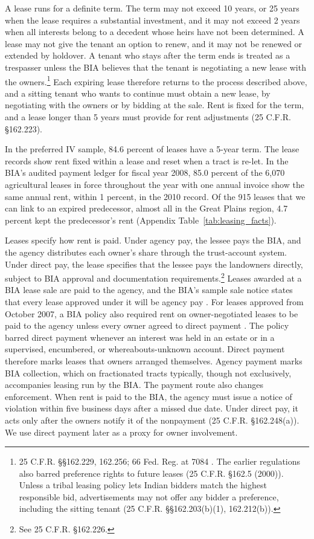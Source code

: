 \documentclass[12pt]{article}
\begin{document}
A lease runs for a definite term. The term may not exceed 10 years, or 25 years when the lease requires a substantial investment, and it may not exceed 2 years when all interests belong to a decedent whose heirs have not been determined. A lease may not give the tenant an option to renew, and it may not be renewed or extended by holdover. A tenant who stays after the term ends is treated as a trespasser unless the BIA believes that the tenant is negotiating a new lease with the owners.\footnote{25 C.F.R. \S\S 162.229, 162.256; 66 Fed. Reg. at 7084 \citep{DOI2001LeasingRule}. The earlier regulations also barred preference rights to future leases (25 C.F.R. \S 162.5 (2000)). Unless a tribal leasing policy lets Indian bidders match the highest responsible bid, advertisements may not offer any bidder a preference, including the sitting tenant (25 C.F.R. \S\S 162.203(b)(1), 162.212(b)).} Each expiring lease therefore returns to the process described above, and a sitting tenant who wants to continue must obtain a new lease, by negotiating with the owners or by bidding at the sale. Rent is fixed for the term, and a lease longer than 5 years must provide for rent adjustments (25 C.F.R. \S 162.223).

In the preferred IV sample, 84.6 percent of leases have a 5-year term. The lease records show rent fixed within a lease and reset when a tract is re-let. In the BIA's audited payment ledger for fiscal year 2008, 85.0 percent of the 6,070 agricultural leases in force throughout the year with one annual invoice show the same annual rent, within 1 percent, in the 2010 record. Of the 915 leases that we can link to an expired predecessor, almost all in the Great Plains region, 4.7 percent kept the predecessor's rent (Appendix Table~\ref{tab:leasing_facts}).

Leases specify how rent is paid. Under agency pay, the lessee pays the BIA, and the agency distributes each owner's share through the trust-account system. Under direct pay, the lease specifies that the lessee pays the landowners directly, subject to BIA approval and documentation requirements.\footnote{See 25 C.F.R. \S 162.226.} Leases awarded at a BIA lease sale are paid to the agency, and the BIA's sample sale notice states that every lease approved under it will be agency pay \citep[Attachment~14A]{BIA2006Ch2}. For leases approved from October 2007, a BIA policy also required rent on owner-negotiated leases to be paid to the agency unless every owner agreed to direct payment \citep{BIA2007NPM}. The policy barred direct payment whenever an interest was held in an estate or in a supervised, encumbered, or whereabouts-unknown account. Direct payment therefore marks leases that owners arranged themselves. Agency payment marks BIA collection, which on fractionated tracts typically, though not exclusively, accompanies leasing run by the BIA. The payment route also changes enforcement. When rent is paid to the BIA, the agency must issue a notice of violation within five business days after a missed due date. Under direct pay, it acts only after the owners notify it of the nonpayment (25 C.F.R. \S 162.248(a)). We use direct payment later as a proxy for owner involvement.
\end{document}
